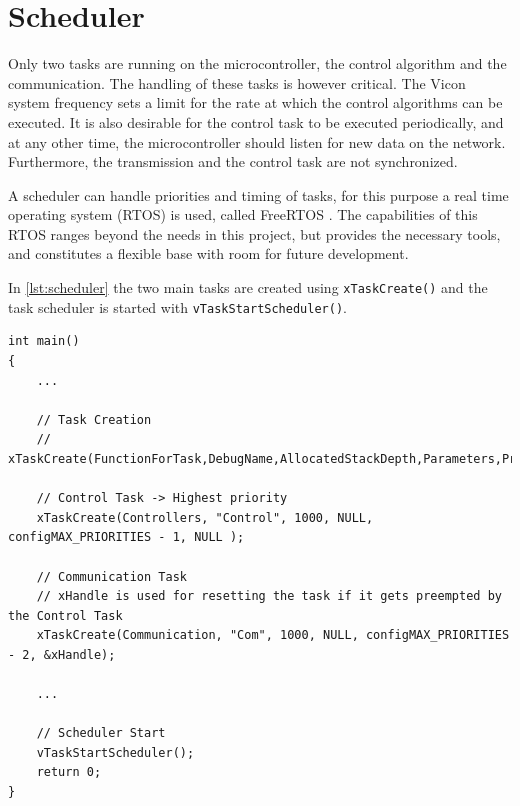\section{Scheduler}\label{sec:Scheduler}
Only two tasks are running on the microcontroller, the control algorithm and the communication. The handling of these tasks is however critical. The Vicon system frequency sets a limit for the rate at which the control algorithms can be executed. It is also desirable for the control task to be executed periodically, and at any other time, the microcontroller should listen for new data on the network. Furthermore, the transmission and the control task are not synchronized.

A scheduler can handle priorities and timing of tasks, for this purpose a real time operating system (RTOS) is used, called FreeRTOS \cite{freeRtos}. The capabilities of this RTOS ranges beyond the needs in this project, but provides the necessary tools, and constitutes a flexible base with room for future development.

In \autoref{lst:scheduler} the two main tasks are created using \lstinline[style=customcppinline]{xTaskCreate()} and the task scheduler is started with \lstinline[style=customcppinline]{vTaskStartScheduler()}.

\begin{lstlisting}[style=customcpp,
                    caption={Code for initialization, creation of the different tasks, start sequence for the motors and call to the scheduler.}, 
                    label=lst:scheduler]
int main()
{
    ... 
    
    // Task Creation
    // xTaskCreate(FunctionForTask,DebugName,AllocatedStackDepth,Parameters,Priority,TaskHandle)
    
    // Control Task -> Highest priority
    xTaskCreate(Controllers, "Control", 1000, NULL, configMAX_PRIORITIES - 1, NULL );
    
    // Communication Task 
    // xHandle is used for resetting the task if it gets preempted by the Control Task
    xTaskCreate(Communication, "Com", 1000, NULL, configMAX_PRIORITIES - 2, &xHandle);
    
    ...

    // Scheduler Start 
    vTaskStartScheduler();
    return 0;
}
\end{lstlisting}

